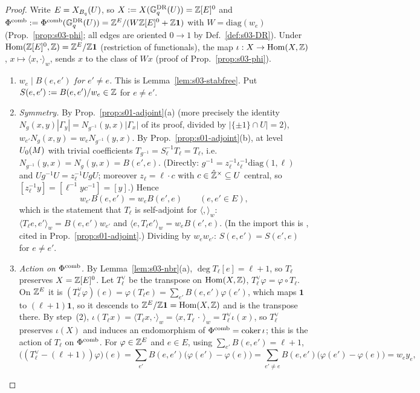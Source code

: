 \begin{proof}
Write $E=X_{B_q}(U)$, so $X:=X(\mathbb{G}^{\mathrm{DR}}_q(U))=\mathbb{Z}[E]^0$ and $\Phi^{\mathrm{comb}}:=\Phi^{\mathrm{comb}}(\mathbb{G}^{\mathrm{DR}}_q(U))=\mathbb{Z}^E/(W\mathbb{Z}[E]^0+\mathbb{Z}\mathbf1)$ with $W=\mathrm{diag}(w_e)$
(Prop.~\ref{prop:s03-phi}; all edges are oriented $0\to1$ by Def.~\ref{def:s03-DR}). Under $\operatorname{Hom}(\mathbb{Z}[E]^0,\mathbb{Z})=\mathbb{Z}^E/\mathbb{Z}\mathbf1$ (restriction of functionals),
the map $\iota:X\to\operatorname{Hom}(X,\mathbb{Z})$, $x\mapsto\langle x,\cdot\rangle_w$, sends $x$ to the class of $Wx$ (proof of Prop.~\ref{prop:s03-phi}).
\begin{enumerate}[label=(\arabic*)]
\item \emph{$w_e\mid B(e,e')$ for $e'\ne e$.} This is Lemma~\ref{lem:s03-stabfree}. Put $S(e,e'):=B(e,e')/w_e\in\mathbb{Z}$ for $e\ne e'$.
\item \emph{Symmetry.} By Prop.~\ref{prop:s01-adjoint}(a) (more precisely the identity $N_g(x,y)|\Gamma_y|=N_{g^{-1}}(y,x)|\Gamma_x|$ of its proof, divided by
  $|\{\pm1\}\cap U|=2$), $w_{e'}N_g(x,y)=w_eN_{g^{-1}}(y,x)$. By Prop.~\ref{prop:s01-adjoint}(b), at level $U_0(M)$ with trivial coefficients
  $T_{g^{-1}}=S_\ell^{-1}T_\ell=T_\ell$, i.e.\ $N_{g^{-1}}(y,x)=N_g(y,x)=B(e',e)$. (Directly: $g^{-1}=z_\ell^{-1}\iota_\ell^{-1}\mathrm{diag}(1,\ell)$ and
  $Ug^{-1}U=z_\ell^{-1}UgU$; moreover $z_\ell=\ell\cdot c$ with $c\in\hat{\mathbb{Z}}^\times\subseteq U$ central, so $[z_\ell^{-1}y]=[\ell^{-1}yc^{-1}]=[y]$.) Hence
  \[w_{e'}B(e,e')=w_eB(e',e)\qquad(e,e'\in E),\]
  which is the statement that $T_\ell$ is self-adjoint for $\langle,\rangle_w$: $\langle T_\ell e,e'\rangle_w=B(e,e')w_{e'}$ and
  $\langle e,T_\ell e'\rangle_w=w_eB(e',e)$. (In the import this is , cited in Prop.~\ref{prop:s01-adjoint}.) Dividing by
  $w_ew_{e'}$: $S(e,e')=S(e',e)$ for $e\ne e'$.
\item \emph{Action on $\Phi^{\mathrm{comb}}$.} By Lemma~\ref{lem:s03-nbr}(a), $\deg T_\ell[e]=\ell+1$, so $T_\ell$ preserves $X=\mathbb{Z}[E]^0$. Let $T_\ell^\vee$ be the transpose on
  $\operatorname{Hom}(X,\mathbb{Z})$, $T_\ell^\vee\varphi=\varphi\circ T_\ell$. On $\mathbb{Z}^E$ it is $(T_\ell^\vee\varphi)(e)=\varphi(T_\ell e)=\sum_{e'}B(e,e')\varphi(e')$, which maps $\mathbf 1$
  to $(\ell+1)\mathbf 1$, so it descends to $\mathbb{Z}^E/\mathbb{Z}\mathbf1=\operatorname{Hom}(X,\mathbb{Z})$ and is the transpose there. By step~(2),
  $\iota(T_\ell x)=\langle T_\ell x,\cdot\rangle_w=\langle x,T_\ell\,\cdot\,\rangle_w=T_\ell^\vee\iota(x)$, so $T_\ell^\vee$ preserves $\iota(X)$ and induces an endomorphism
  of $\Phi^{\mathrm{comb}}=\operatorname{coker}\iota$; this is the action of $T_\ell$ on $\Phi^{\mathrm{comb}}$. For $\varphi\in\mathbb{Z}^E$ and $e\in E$, using $\sum_{e'}B(e,e')=\ell+1$,
  \[\big((T_\ell^\vee-(\ell+1))\varphi\big)(e)=\sum_{e'}B(e,e')\big(\varphi(e')-\varphi(e)\big)=\sum_{e'\ne e}B(e,e')\big(\varphi(e')-\varphi(e)\big)=w_ey_e,\]

\end{enumerate}
\end{proof}
